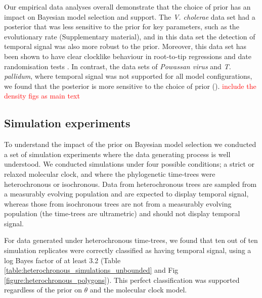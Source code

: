\documentclass[10pt,letterpaper]{article}
\begin{document}
Our empirical data analyses overall demonstrate that the choice of prior has an impact on Bayesian model selection and support. The \textit{V. cholerae} data set had a posterior that was less sensitive to the prior for key parameters, such as the evolutionary rate (Supplementary material), and in this data set the detection of temporal signal was also more robust to the prior. Moreover, this data set has been shown to have clear clocklike behaviour in root-to-tip regressions and date randomisation tests \cite{duchene2016genome}. In contrast, the data sets of \textit{Powassan virus} and \textit{T. pallidum}, where temporal signal was not supported for all model configurations, we found that the posterior is more sensitive to the choice of prior (). \textcolor{red}{include the density figs as main text}

\subsection*{Simulation experiments}
To understand the impact of the prior on Bayesian model selection we conducted a set of simulation experiments where the data generating process is well understood. We conducted simulations under four possible conditions; a strict or relaxed molecular clock, and where the phylogenetic time-trees were heterochronous or isochronous. Data from heterochronous trees are sampled from a measurably evolving population and are expected to display temporal signal, whereas those from isochronous trees are not from a measurably evolving population (the time-trees are ultrametric) and should not display temporal signal. 

For data generated under heterochronous time-trees, we found that ten out of ten simulation replicates were correctly classified as having temporal signal, using a log Bayes factor of at least 3.2 (Table \ref{table:heterochronous_simulations_unbounded} and Fig \ref{figure:heterochronous_polygons}). This perfect classification was supported regardless of the prior on $\theta$ and the molecular clock model. 
\end{document}

